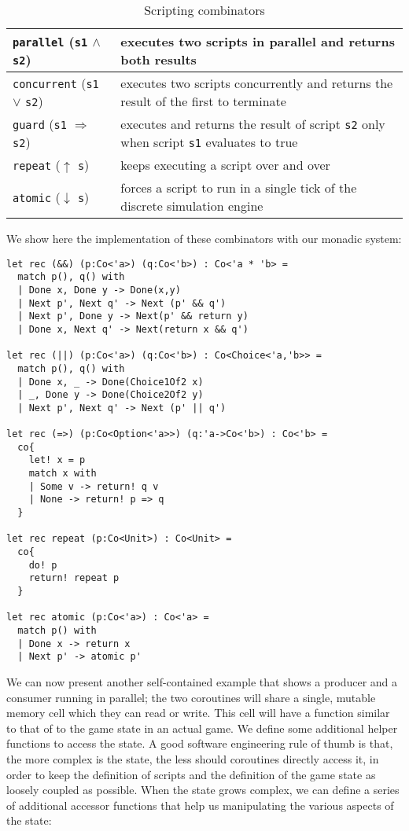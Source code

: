 \begin{table}[ht]
\caption{Scripting combinators}
\centering
\begin{tabular}{ | l | p{6cm} | } 
\hline
\texttt{parallel} (\texttt{s1} $\wedge$ \texttt{s2}) & executes two scripts in parallel and returns both results \\
\hline
\texttt{concurrent} (\texttt{s1} $\vee$ \texttt{s2}) & executes two scripts concurrently and returns the result of the first to terminate \\
\hline
\texttt{guard} (\texttt{s1} $\Rightarrow$ \texttt{s2}) & executes and returns the result of script \texttt{s2} only when script \texttt{s1} evaluates to true \\
\hline
\texttt{repeat} ($\uparrow$ \texttt{s}) & keeps executing a script over and over \\
\hline
\texttt{atomic} ($\downarrow$ \texttt{s}) & forces a script to run in a single tick of the discrete simulation engine \\
\hline
\end{tabular} 
\label{table:scripting_combinators}
\end{table}

We show here the implementation of these combinators with our monadic system:

\begin{lstlisting}
let rec (&&) (p:Co<'a>) (q:Co<'b>) : Co<'a * 'b> =
  match p(), q() with
  | Done x, Done y -> Done(x,y)
  | Next p', Next q' -> Next (p' && q')
  | Next p', Done y -> Next(p' && return y)
  | Done x, Next q' -> Next(return x && q')

let rec (||) (p:Co<'a>) (q:Co<'b>) : Co<Choice<'a,'b>> =
  match p(), q() with
  | Done x, _ -> Done(Choice1Of2 x)
  | _, Done y -> Done(Choice2Of2 y)
  | Next p', Next q' -> Next (p' || q')

let rec (=>) (p:Co<Option<'a>>) (q:'a->Co<'b>) : Co<'b> = 
  co{
    let! x = p
    match x with
    | Some v -> return! q v
    | None -> return! p => q
  }

let rec repeat (p:Co<Unit>) : Co<Unit> = 
  co{ 
    do! p
    return! repeat p
  }

let rec atomic (p:Co<'a>) : Co<'a> =  
  match p() with
  | Done x -> return x
  | Next p' -> atomic p'
\end{lstlisting}

We can now present another self-contained example that shows a producer and a consumer running in parallel; the two coroutines will share a single, mutable memory cell which they can read or write. This cell will have a function similar to that of to the game state in an actual game. We define some additional helper functions to access the state. A good software engineering rule of thumb is that, the more complex is the state, the less should coroutines directly access it, in order to keep the definition of scripts and the definition of the game state as loosely coupled as possible. When the state grows complex, we can define a series of additional accessor functions that help us manipulating the various aspects of the state:

